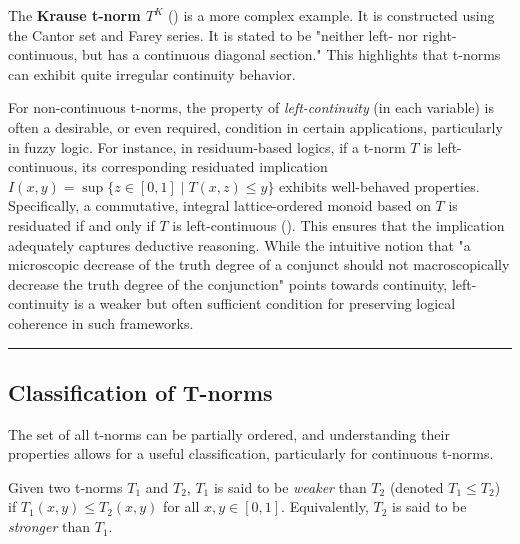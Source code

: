 The \textbf{Krause t-norm $T^K$} (\cite[App.~B.1, Thm.~B.1]{Klement2000}) is a more complex example. It is constructed using the Cantor set and Farey series. It is stated to be "neither left- nor right-continuous, but has a continuous diagonal section." This highlights that t-norms can exhibit quite irregular continuity behavior.

\begin{remark}
For non-continuous t-norms, the property of \emph{left-continuity} (in each variable) is often a desirable, or even required, condition in certain applications, particularly in fuzzy logic. For instance, in residuum-based logics, if a t-norm $T$ is left-continuous, its corresponding residuated implication $I(x,y) = \sup\{z \in [0,1] \mid T(x,z) \le y\}$ exhibits well-behaved properties. Specifically, a commutative, integral lattice-ordered monoid based on $T$ is residuated if and only if $T$ is left-continuous (\cite[Prop.~2.47, p.~63]{Klement2000}). This ensures that the implication adequately captures deductive reasoning. While the intuitive notion that "a microscopic decrease of the truth degree of a conjunct should not macroscopically decrease the truth degree of the conjunction" points towards continuity, left-continuity is a weaker but often sufficient condition for preserving logical coherence in such frameworks.
\end{remark}


\noindent\rule{\textwidth}{2pt}


\subsection{Classification of T-norms}


The set of all t-norms can be partially ordered, and understanding their properties allows for a useful classification, particularly for continuous t-norms.

\begin{definition}
  Given two t-norms $T_1$ and $T_2$, $T_1$ is said to be \emph{weaker} than $T_2$ (denoted $T_1 \leq T_2$) if $T_1(x,y) \leq T_2(x,y)$ for all $x,y \in [0,1]$.
  Equivalently, $T_2$ is said to be \emph{stronger} than $T_1$.
\end{definition}

